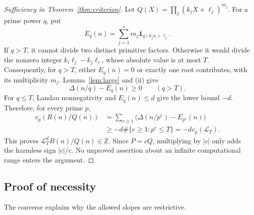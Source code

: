 \documentclass[11pt]{article}
\theoremstyle{definition}
\theoremstyle{remark}
\newcommand{\Z}{\mathbb Z}
\newcommand{\vp}{v_p}
\newcommand{\ind}{\mathbf 1}
\newcommand{\LL}{\mathcal L}
\begin{document}
\begin{proof}[Sufficiency in Theorem~\ref{thm:criterion}]
Let $Q(X)=\prod_j(k_jX+\ell_j)^{m_j}$. For a prime power $q$, put
\[
 E_q(n)=\sum_{j=1}^s m_j\ind_{q\mid k_jn+\ell_j}.
\]
If $q>T$, it cannot divide two distinct primitive factors. Otherwise
it would divide the nonzero integer
$k_i\ell_j-k_j\ell_i$, whose absolute value is at most $T$.
Consequently, for $q>T$, either $E_q(n)=0$ or exactly one root
contributes, with its multiplicity $m_j$. Lemma~\ref{lem:large} and
(ii) give
\begin{equation}\label{eq:termwiseHigh}
 \Delta(n/q)-E_q(n)\geq0\qquad(q>T).
\end{equation}
For $q\leq T$, Landau nonnegativity and $E_q(n)\leq d$ give the lower
bound $-d$. Therefore, for every prime $p$,
\begin{align*}
 \vp(R(n)/Q(n))
 &=\sum_{e\geq1}\bigl(\Delta(n/p^e)-E_{p^e}(n)\bigr)\\
 &\geq-d\#\{e\geq1:p^e\leq T\}
 =-d\vp(\LL_T).
\end{align*}
This proves $\LL_T^dR(n)/Q(n)\in\Z$. Since $P=cQ$, multiplying
by $|c|$ only adds the harmless sign $|c|/c$. No unproved assertion
about an infinite computational range enters the argument.
\end{proof}

\subsection{Proof of necessity}
The converse explains why the allowed slopes are restrictive.
\end{document}
